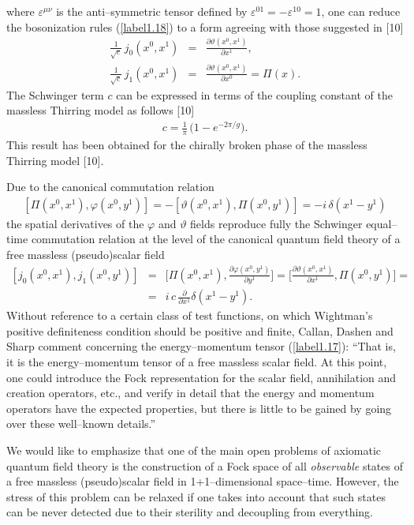 \documentclass[a4paper,12pt] {article}
\begin{document}
%
where $\varepsilon^{\mu\nu}$ is the anti--symmetric tensor defined by
$\varepsilon^{01} = -\varepsilon^{10} = 1$, one can reduce the
bosonization rules (\ref{label1.18}) to a form agreeing with those
suggested in [10]
%
\begin{eqnarray}\label{label1.21}
\frac{1}{\sqrt{c}}\,j_0(x^0, x^1) &=& \frac{\partial \vartheta(x^0,
x^1)}{\partial x^1},\nonumber\\ \frac{1}{\sqrt{c}}\,j_1(x^0, x^1) &=&
\frac{\partial \vartheta(x^0, x^1)}{\partial x^0} = \Pi(x).
\end{eqnarray}
%
The Schwinger term $c$ can be expressed in terms of the coupling
constant of the massless Thirring model as follows [10]
%
\begin{eqnarray}\label{label1.22}
c = \frac{1}{\pi}\,\Big(1 - e^{\textstyle -2\pi/g}\Big).
\end{eqnarray}
%
This result has been obtained for the chirally broken phase of the
massless Thirring model [10].

Due to the canonical commutation relation 
%
\begin{eqnarray}\label{label1.23}
[\Pi(x^0,x^1), \varphi(x^0, y^1)] = - [\vartheta(x^0, x^1),
\Pi(x^0,y^1)] = - i\,\delta(x^1 - y^1)
\end{eqnarray}
%
the spatial derivatives of the $\varphi$ and $\vartheta$ fields
reproduce fully the Schwinger equal--time commutation relation at the
level of the canonical quantum field theory of a free massless
(pseudo)scalar field
%
\begin{eqnarray}\label{label1.24}
[j_0(x^0,x^1), j_1(x^0, y^1)] &=& \Big[\Pi(x^0,x^1),
\frac{\partial\varphi(x^0, y^1)}{\partial y^1}\Big] =
\Big[\frac{\partial\vartheta(x^0, x^1)}{\partial x^1},
\Pi(x^0,y^1)\Big] =\nonumber\\ &=& i\,c\,\frac{\partial}{\partial
x^1}\delta(x^1 - y^1).
\end{eqnarray}
%
Without reference to a certain class of test functions, on which
Wightman's positive definiteness condition should be positive and
finite, Callan, Dashen and Sharp comment concerning the
energy--momentum tensor (\ref{label1.17}): ``That is, it is the
energy--momentum tensor of a free massless scalar field. At this
point, one could introduce the Fock representation for the scalar
field, annihilation and creation operators, etc., and verify in detail
that the energy and momentum operators have the expected properties,
but there is little to be gained by going over these well--known
details.''

We would like to emphasize that one of the main open problems of
axiomatic quantum field theory is the construction of a Fock space of
all {\it observable} states of a free massless (pseudo)scalar field in
1+1--dimensional space--time. However, the stress of this problem can
be relaxed if one takes into account that such states can be never
detected due to their sterility and decoupling from everything.
\end{document}

